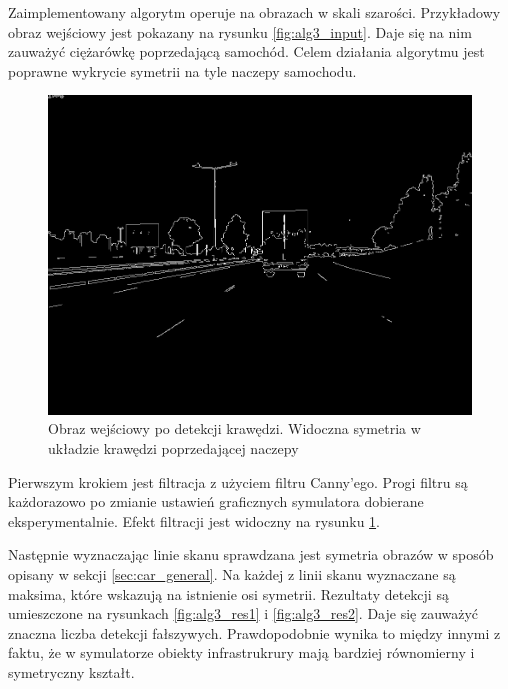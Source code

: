 Zaimplementowany algorytm operuje na obrazach w skali szarości. Przykładowy obraz wejściowy jest pokazany na rysunku \ref{fig:alg3_input}. Daje się na nim zauważyć ciężarówkę poprzedającą samochód. Celem działania algorytmu jest poprawne wykrycie symetrii na tyle naczepy samochodu.

\begin{figure}
  \centering
  \includegraphics[width=13cm]{img/alg3_canny.jpg}
  \caption{Obraz wejściowy po detekcji krawędzi. Widoczna symetria w układzie krawędzi poprzedającej naczepy}
  \label{fig:alg3_canny}
\end{figure}

Pierwszym krokiem jest filtracja z użyciem filtru Canny'ego. Progi filtru są każdorazowo po zmianie ustawień graficznych symulatora dobierane eksperymentalnie. Efekt filtracji jest widoczny na rysunku \ref{fig:alg3_canny}.

Następnie wyznaczając linie skanu sprawdzana jest symetria obrazów w sposób opisany w sekcji \ref{sec:car_general}. Na każdej z linii skanu wyznaczane są maksima, które wskazują na istnienie osi symetrii. Rezultaty detekcji są umieszczone na rysunkach \ref{fig:alg3_res1} i \ref{fig:alg3_res2}. Daje się zauważyć znaczna liczba detekcji fałszywych. Prawdopodobnie wynika to między innymi z faktu, że w symulatorze obiekty infrastrukrury mają bardziej równomierny i symetryczny kształt.

